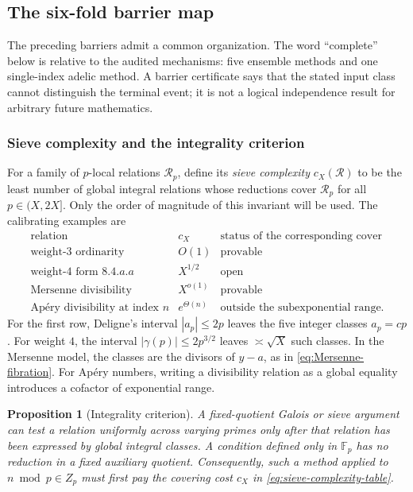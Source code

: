 \documentclass[11pt]{amsart}
\theoremstyle{plain}
\newtheorem{proposition}{Proposition}
\theoremstyle{remark}
\begin{document}
\subsection{The six-fold barrier map}\label{sec:sixfold-barrier}

The preceding barriers admit a common organization.  The word
``complete'' below is relative to the audited mechanisms: five
ensemble methods and one single-index adelic method.  A barrier
certificate says that the stated input class cannot distinguish the
terminal event; it is not a logical independence result for arbitrary
future mathematics.

\subsubsection{Sieve complexity and the integrality criterion}

For a family of $p$-local relations $\mathcal R_p$, define its
\emph{sieve complexity} $c_X(\mathcal R)$ to be the least number of
global integral relations whose reductions cover $\mathcal R_p$ for
all $p\in(X,2X]$.  Only the order of magnitude of this invariant will
be used.  The calibrating examples are
\[
\begin{array}{c|c|c}
\text{relation}&c_X&\text{status of the corresponding cover}\\ \hline
\text{weight-$3$ ordinarity}&O(1)&\text{provable}\\
\text{weight-$4$ form $8.4.a.a$}&X^{1/2}&\text{open}\\
\text{Mersenne divisibility}&X^{o(1)}&\text{provable}\\
\text{Ap\'ery divisibility at index }n&e^{\Theta(n)}&
  \text{outside the subexponential range}.
\end{array}
\tag{8.8}\label{eq:sieve-complexity-table}
\]
For the first row, Deligne's interval $|a_p|\leq2p$ leaves the five
integer classes $a_p=cp$.  For weight $4$, the interval
$|\gamma(p)|\leq2p^{3/2}$ leaves $\asymp\sqrt X$ such classes.  In the
Mersenne model, the classes are the divisors of $y-a$, as in
\eqref{eq:Mersenne-fibration}.  For Ap\'ery numbers, writing a
divisibility relation as a global equality introduces a cofactor of
exponential range.

\begin{proposition}[Integrality criterion]
\label{prop:integrality-criterion}
A fixed-quotient Galois or sieve argument can test a relation uniformly
across varying primes only after that relation has been expressed by
global integral classes.  A condition defined only in $\mathbb F_p$
has no reduction in a fixed auxiliary quotient.  Consequently, such a
method applied to $n\bmod p\in Z_p$ must first pay the covering cost
$c_X$ in \eqref{eq:sieve-complexity-table}.
\end{proposition}
\end{document}
